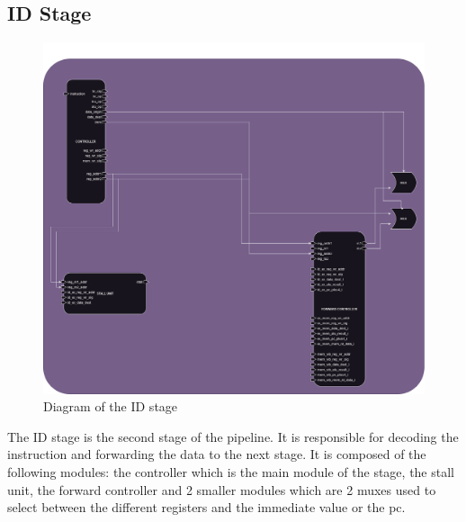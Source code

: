 \subsection{ID Stage}

\begin{figure}[H]
\centering
\includegraphics[width=1\textwidth]{../diagrams/decode/id_stage.png}
\caption{Diagram of the ID stage}
\label{fig:id_stage}
\end{figure}

The ID stage is the second stage of the pipeline. It is responsible for decoding the instruction and forwarding the data to the next stage. 
It is composed of the following modules: the controller which is the main module of the stage, the stall unit, the forward controller and 
2 smaller modules which are 2 muxes used to select between the different registers and the immediate value or the pc.




